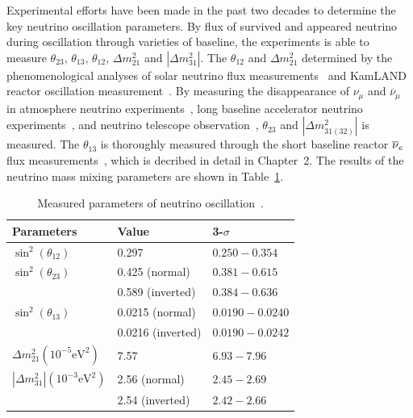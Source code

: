     Experimental efforts have been made in the past two decades to determine the key neutrino oscillation parameters.
    By flux of survived and appeared neutrino during oscillation through varieties of baseline, the experiments is able to measure $\theta_{23}$, $\theta_{13}$, $\theta_{12}$, $\Delta m^2_{21}$ and $|\Delta m^2_{31}|$. 
    The $\theta_{12}$ and $\Delta m^2_{21}$ determined by the  phenomenological analyses of solar neutrino flux measurements~\cite{bib:SNOPRC} and KamLAND reactor \nuebar oscillation measurement~\cite{bib:KamLAND03}.
    By measuring the disappearance of $\nu_\mu$ and $\overline{\nu}_\mu$ in atmosphere neutrino experiments~\cite{bib:MACRO,bib:Soudan2}, long baseline accelerator neutrino experiments~\cite{bib:k2k,bib:MINOS,bib:t2k,bib:nova}, and neutrino telescope observation~\cite{bib:ANTARES, bib:ICEosc}, $\theta_{23}$ and $|\Delta m^2_{31(32)}|$ is measured.
    The $\theta_{13}$ is thoroughly measured through the short baseline reactor $\overline{\nu }_{e}\hspace{1pt}$ flux measurements~\cite{bib:DYBosc,bib:RENO,bib:DBChooz}, which is decribed in detail in Chapter~2.
    The results of the neutrino mass mixing parameters are shown in Table~\ref{tab:1.1}.
    \begin{table}[h]
    \centering
    \caption[Neutrino Oscillation Parameters]{Measured parameters of neutrino oscillation~\cite{bib:PDG}.}
    \begin{tabular}{lll}
    \hline
    \hline
    Parameters                  & Value             & 3-$\sigma$    \\ \hline
    $\sin^2(\theta _{12})$      & 0.297             & $0.250 - 0.354$
    \\ \hline
    $\sin^2(\theta _{23})$      & 0.425 (normal)    & $0.381 - 0.615$ \\
                                & 0.589 (inverted)  & $0.384 - 0.636$ \\ \hline
    $\sin^2(\theta_{13})$       & 0.0215 (normal)   & $0.0190 - 0.0240$ \\   
                                & 0.0216 (inverted) & $0.0190 - 0.0242$ \\ \hline
    $\Delta m^ 2_{21} (10^{-5}\textrm{eV}^2) $      & 7.57              & $6.93 - 7.96$ \\ \hline
    $|\Delta m^ 2_{31}| (10^{-3}\textrm{eV}^2) $    & 2.56 (normal)     & $2.45 - 2.69$\\
                                & 2.54 (inverted)   & $2.42 - 2.66$\\
    \hline
    \end{tabular}

    \label{tab:1.1}
    \end{table}
    
